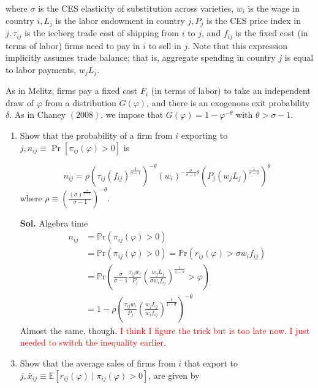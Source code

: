 \documentclass[12pt,oneside,reqno]{amsart}
\newcommand{\pr}{\mathbb{P}\mathrm{r}}
\newcommand{\E}{\mathbb{E}}
\begin{document}
where $\sigma$ is the CES elasticity of substitution across varieties, $w_{i}$ is the wage in country $i, L_{j}$ is the labor endowment in country $j, P_{j}$ is the CES price index in $j, \tau_{i j}$ is the iceberg trade cost of shipping from $i$ to $j$, and $f_{i j}$ is the fixed cost (in terms of labor) firms need to pay in $i$ to sell in $j$. Note that this expression implicitly assumes trade balance; that is, aggregate spending in country $j$ is equal to labor payments, $w_{j} L_{j}$.

As in Melitz, firms pay a fixed cost $F_{i}$ (in terms of labor) to take an independent draw of $\varphi$ from a distribution $G(\varphi)$, and there is an exogenous exit probability $\delta$. As in Chaney $(2008)$, we impose that $G(\varphi)=1-\varphi^{-\theta}$ with $\theta>\sigma-1$.
\begin{enumerate}[label=\textbf{\roman*.}]
    \item Show that the probability of a firm from $i$ exporting to $j, n_{i j} \equiv \Pr\left[\pi_{i j}(\varphi)>0\right]$ is

\begin{equation*}
n_{i j}=\rho\left(\tau_{i j}\left(f_{i j}\right)^{\frac{1}{\sigma-1}}\right)^{-\theta}\left(w_{i}\right)^{-\frac{\sigma}{\sigma-1} \theta}\left(P_{j}\left(w_{j} L_{j}\right)^{\frac{1}{\sigma-1}}\right)^{\theta}
\end{equation*}
where $\rho \equiv\left(\frac{(\sigma)^{\frac{\sigma}{\sigma-1}}}{\sigma-1}\right)^{-\theta}$.
\item[\textbf{Sol.}] Algebra time
\begin{align*}
    n_{ij} &= \pr\left( \pi_{ij}(\varphi)>0\right) \\
    &= \pr\left( \pi_{ij}(\varphi)>0\right) = \pr\left( r_{ij}(\varphi)>\sigma w_if_{ij}\right) \\ 
    &= \pr\left(\frac{\sigma}{\sigma-1}\frac{\tau_{ij}w_i}{P_j}\left(\frac{w_jL_j}{\sigma w_if_{ij}}\right)^{\frac{1}{1-\sigma}}>\varphi\right) \\ 
    &= 1- \rho \left(\frac{\tau_{ij}w_i}{P_j}\left(\frac{w_jL_j}{w_if_{ij}}\right)^{\frac{1}{1-\sigma}}\right)^{-\theta}
\end{align*}
Almost the same, though. \textcolor{red}{I think I figure the trick but is too late now. I just needed to switch the inequality earlier}. 

\item Show that the average sales of firms from $i$ that export to $j, \bar{x}_{i j} \equiv \E\left[r_{i j}(\varphi) \mid \pi_{i j}(\varphi)>0\right]$, are given by


\end{enumerate}
\end{document}
